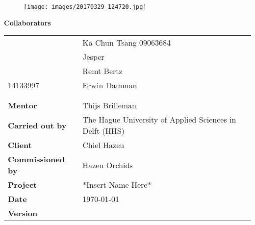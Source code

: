 \begin{titlepage}
		
	\begin{center}
		\LARGE{\textbf{\thistitle}}
	\end{center}
	
	\begin{figure}[h]
		\texttt{[image: images/20170329\_124720.jpg]}
	\end{figure}
	
	\bigskip
	\textbf{Collaborators}
	\begin{table}[h]
		\begin{tabular}{@{}ll@{}}
			                 & Ka Chun Tsang 09063684                                         \\
			                 & Jesper                                           \\
			                 & Remt Bertz                                        \\
			14133997                 & Erwin Damman                                            \\
			                         &              										   \\
			                         &              										   \\
			\textbf{Mentor}          & Thijs Brilleman                                         \\
			\textbf{Carried out by}  & The Hague University of Applied Sciences in Delft (HHS) \\
			\textbf{Client}          & Chiel Hazeu                                             \\
			\textbf{Commissioned by} & Hazeu Orchids                                           \\
			\textbf{Project}         & *Insert Name Here*                                      \\
			\textbf{Date}            & \today                                                  \\
			\textbf{Version}         & \version          									   \\
		\end{tabular}
	\end{table}
\end{titlepage}



